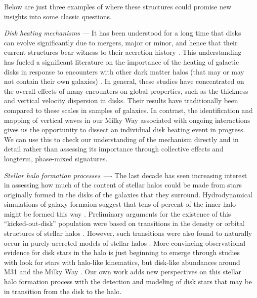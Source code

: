 \documentclass[galaxies,article,submit,moreauthors,pdftex,10pt,a4paper]{mdpi}
\begin{document}
Below are just three examples of where these structures could promise new insights into some classic questions.
\begin{description}
\item{\it Disk heating mechanisms ---}
It has been understood for a long time that disks can evolve significantly due to mergers, major or minor, and hence that their current structures bear witness to their accretion history \cite{toth92,quinn93,walker96,velazquez99}.
This understanding has fueled a significant literature on the importance of the heating of galactic disks in response to encounters with other dark matter halos (that may or may not contain their own galaxies) \cite{font01,ardi03,benson04,stewart08,hopkins08,villalobos08,purcell09,kazantzidis09,sachdeva16,moetazedian16}.
In general, these studies have concentrated on the overall effects of many encounters on global properties, such as the thickness and vertical velocity dispersion in disks.
Their results have traditionally been compared to these scales in samples of galaxies.
In contrast, the identification and mapping of vertical waves in our Milky Way associated with ongoing interactions gives us the opportunity to dissect an individual disk heating event in progress.
We can use this to check our understanding of the mechanism directly and in detail rather than assessing its importance through collective effects and longterm, phase-mixed signatures.
\item{\it Stellar halo formation processes ----}
The last decade has seen increasing interest in assessing how much of the content of stellar halos could be made from stars originally formed in the disks of the galaxies that they surround. Hydrodynamical simulations of galaxy formaion suggest that tens of percent of the inner halo might be formed this way
\cite{abadi06,zolotov09,zolotov10,font11,mccarthy12,tissera13,tissera14,pillepich15,cooper15}.
Preliminary arguments for the existence of this ``kicked-out-disk'' population were based on transitions in the density or orbital structures of stellar halos \cite[e.g.,][]{carollo07}.
However, such transitions were also found to naturally occur in purely-accreted models of stellar halos \cite{deason13}.
More convincing observational evidence for disk stars in the halo is just beginning to emerge through studies with look for stars with halo-like kinematics, but disk-like abundances around M31 \cite{dorman13} and the Milky Way \cite{sheffield12,hawkins15,bonaca17}.
Our own work adds new perspectives on this stellar halo formation process with the detection and modeling of disk stars that may be in transition from the disk to the halo.

\end{description}
\end{document}
